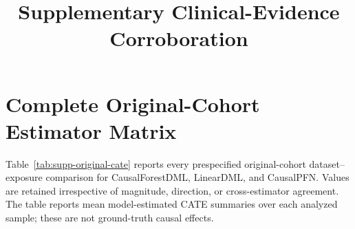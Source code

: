 \documentclass[letterpaper,10pt]{article}
\title{Supplementary Clinical-Evidence Corroboration}
\author{}
\date{}
\begin{document}
\maketitle
\small

\section{Complete Original-Cohort Estimator Matrix}

Table~\ref{tab:supp-original-cate} reports every prespecified original-cohort
dataset--exposure comparison for CausalForestDML, LinearDML, and CausalPFN.
Values are retained irrespective of magnitude, direction, or cross-estimator
agreement. The table reports mean model-estimated CATE summaries over each
analyzed sample; these are not ground-truth causal effects.
\end{document}
